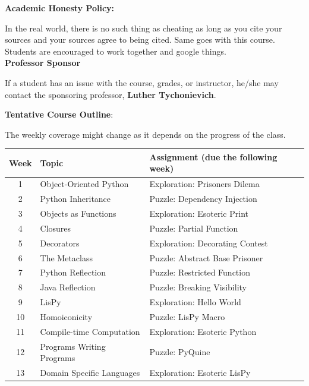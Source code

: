 \documentclass[11pt]{article}
\begin{document}
\textbf {\large Academic Honesty Policy:} 

In the real world, there is no such thing as cheating as long as you cite your sources and your sources agree to being cited. Same goes with this course. Students are encouraged to work together and google things. 
\\

\textbf {\large Professor Sponsor}

If a student has an issue with the course, grades, or instructor, he/she may contact the sponsoring professor, \textbf{Luther Tychonievich}.

\newpage
\textbf {\large Tentative Course Outline}:

The weekly coverage might change as it depends on the progress of the class. 

\begin{center}
\begin{tabular}{c | l | l}
\textbf{Week} & \textbf{Topic} & \textbf{Assignment} (due the following week)  \\
\hline 1 & Object-Oriented Python  & Exploration: Prisoners Dilema \\
2 & Python Inheritance & Puzzle: Dependency Injection \\
3 & Objects as Functions & Exploration: Esoteric Print  \\
4 & Closures & Puzzle: Partial Function\\
5 & Decorators & Exploration: Decorating Contest\\
6 & The Metaclass &  Puzzle: Abstract Base Prisoner\\
7 & Python Reflection & Puzzle: Restricted Function \\
8 & Java Reflection & Puzzle: Breaking Visibility \\
9 & LisPy &  Exploration: Hello World\\
10 & Homoiconicity &  Puzzle: LisPy Macro\\
11 & Compile-time Computation & Exploration: Esoteric Python \\
12 & Programs Writing Programs & Puzzle: PyQuine\\
13 & Domain Specific Languages &  Exploration: Esoteric LisPy
\end{tabular}
\end{center}

\vspace{10mm}
\end{document}
